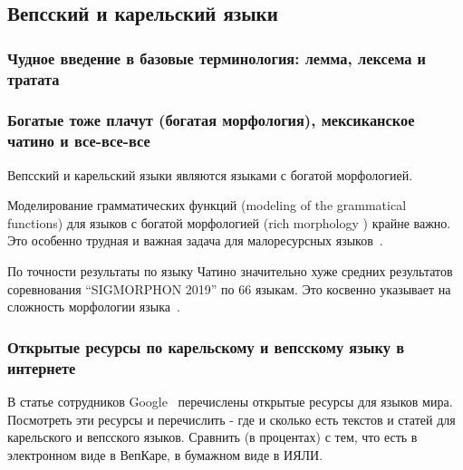 \subsection{Вепсский и карельский языки}\label{sect_review_veps_karelian}


\subsubsection{Чудное введение в базовые терминология: лемма, лексема и тратата}



\subsubsection{Богатые тоже плачут (богатая морфология), мексиканское чатино и все-все-все}

Вепсский и карельский языки являются языками с богатой морфологией.

Моделирование грамматических функций (modeling of the grammatical functions)
для языков с богатой морфологией (rich morphology
) крайне важно.
Это особенно трудная и важная задача
для малоресурсных языков~\cite[2820]{Cruz-Anastasopoulos-Stump2020Chatino}.


\bigskip
По точности результаты по языку Чатино значительно хуже
средних результатов соревнования ``SIGMORPHON 2019'' по 66 языкам.
Это косвенно указывает на сложность морфологии языка~\cite[2822]{Cruz-Anastasopoulos-Stump2020Chatino}.


\subsubsection{Открытые ресурсы по карельскому и вепсскому языку в интернете} \label{sect_open_krl_vep_inet}

В статье сотрудников Google~\cite{Prasad2018} перечислены открытые ресурсы для языков мира.
Посмотреть эти ресурсы и перечислить - где и сколько есть текстов и статей
для карельского и вепсского языков. Сравнить (в процентах) с тем, что есть
в электронном виде в ВепКаре, в бумажном виде в ИЯЛИ.

